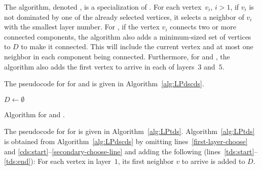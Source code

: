 The
algorithm, denoted \alayersparent, is a specialization of \aparent.
For each vertex~$v_i$, $i>1$,
if $v_i$ is not dominated by one of the already selected
vertices, it selects a neighbor of $v_i$ with the smallest
layer number. 
For \cds, if the vertex $v_i$
connects two or more connected components, the algorithm also adds a
minimum-sized set of 
vertices to $D$ to make it connected. This will include the current
vertex and at most one neighbor in each component being connected.
Furthermore, for \ds and \cds, the algorithm also adds the first
vertex to arrive in each of layers~$3$ and~$5$.

The pseudocode for \alayersparent for \ds and \cds is given in
Algorithm~\ref{alg:LPdscds}.

\begin{algorithm} \DontPrintSemicolon
\SetNoFillComment
\SetAlgoNoLine
{}
{\normalsize
\BlankLine
   $D \gets \emptyset$\;
   }
 \caption{Algorithm \alayersparent for \ds and \cds.\label{alg:LPdscds}}
\end{algorithm}

The pseudocode for \alayersparent for \tds is given in Algorithm~\ref{alg:LPtds}.
Algorithm~\ref{alg:LPtds} is obtained from Algorithm~\ref{alg:LPdscds} by omitting lines~\ref{first-layer-choose} and
\ref{cds:start}--\ref{secondary-choose-line}
and adding the following (lines~\ref{tds:start}--\ref{tds:end}):
For each vertex in layer~$1$, its first neighbor $v$ to arrive is added
to $D$.


